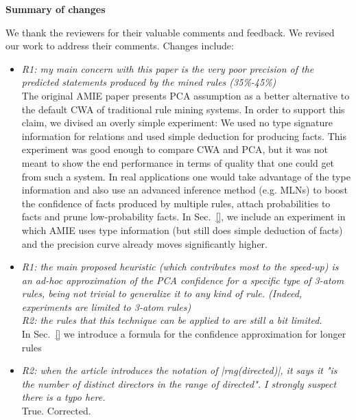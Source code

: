 \begin{figure*}[t!]
\hspace{.1\textwidth}
\begin{minipage}{.8\textwidth}
  \begin{centering}
   \LARGE\textbf{Summary of changes}
    \vspace{.3em}
  \end{centering}
  \large  
  We thank the reviewers for their valuable comments and feedback. We revised our work to address their comments. Changes include:
  
  \begin{itemize}
  
    \item \textit{R1: my main concern with this paper is the very poor precision of the predicted statements produced by the mined rules (35\%-45\%)\\  }
    The original AMIE paper presents PCA assumption as a better alternative to the default CWA of traditional rule mining systems. In order to support this claim,
    we divised an overly simple experiment: We used no type signature information for relations and used simple deduction for producing facts. 
    This experiment was good enough to compare CWA and PCA, but it was not meant to show the end performance in terms of quality that one could get from such a system.
    In real applications one would take advantage of the type information and also use an advanced inference method (e.g. MLNs) to boost the confidence of facts produced by multiple rules,
    attach probabilities to facts and prune low-probability facts. In Sec.~\ref{}, we include an experiment in which AMIE uses type information (but still does simple deduction of facts)
    and the precision curve already moves significantly higher. 
    
  
   \item \textit{R1: the main proposed heuristic (which contributes most to the  speed-up) is an ad-hoc approximation of 
   the PCA confidence for a specific type of 3-atom rules, being not trivial to generalize it to any kind of rule. 
   (Indeed, experiments are limited to 3-atom rules)\\
   R2: the rules that this technique can be applied to are still a bit limited. \\   }
   In Sec.~\ref{} we introduce a formula for the confidence approximation for longer rules
   
   \item \textit{R2: when the article introduces the notation of |rng(directed)|, it says it "is the number of distinct directors in the range of directed". I strongly suspect there is a typo here. \\  }
   True. Corrected.
   

\end{itemize}
\end{minipage}
\end{figure*}
